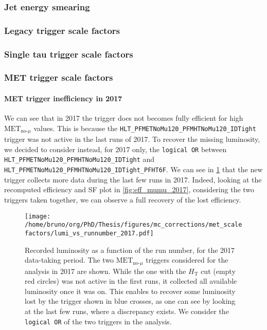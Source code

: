 \documentclass[11pt]{article}
\newcommand{\httt}{H_{\text{T}}}
\newcommand{\metnomu}{\text{MET}_{\text{no-}\mu}}
\newcommand{\logicor}[1]{\texttt{logical~OR}}
\begin{document}
\subsubsection{Jet energy smearing}
\label{sec:org4f72511}
\subsubsection{Legacy trigger scale factors}
\label{sec:orgbfe789a}
\subsubsection{Single tau trigger scale factors}
\label{sec:org2f33b5b}
\subsubsection{MET trigger scale factors}
\label{sec:org852d869}
\paragraph{MET trigger inefficiency in 2017}

We can see that in 2017 the trigger does not becomes fully efficient for high \(\metnomu\) values.
This is because the \texttt{HLT\_PFMETNoMu120\_PFMHTNoMu120\_IDTight} trigger was not active in the last runs of 2017.
To recover the missing luminosity, we decided to consider instead, for 2017 only, the \logicor{} between \texttt{HLT\_PFMETNoMu120\_PFMHTNoMu120\_IDTight} and \texttt{HLT\_PFMETNoMu120\_PFMHTNoMu120\_IDTight\_PFHT6F}.
We can see in \cref{fig:lumi_vs_runnumber_2017} that the new trigger collects more data during the last few runs in 2017.
Indeed, looking at the recomputed efficiency and SF plot in \cref{fig:eff_mumu_2017}, considering the two triggers taken together, we can observe a full recovery of the lost efficiency.

\begin{figure}
\texttt{[image: /home/bruno/org/PhD/Thesis/figures/mc\_corrections/met\_scalefactors/lumi\_vs\_runnumber\_2017.pdf]}
\caption{\label{fig:lumi_vs_runnumber_2017}Recorded luminosity as a function of the run number, for the 2017 data-taking period. The two \(\metnomu\) triggers considered for the analysis in 2017 are shown. While the one with the \(\httt\) cut (empty red circles) was not active in the first runs,  it collected all available luminosity once it was on. This enables to recover some luminosity lost by the trigger shown in blue crosses, as one can see by looking at the last few runs, where a discrepancy exists. We consider the \logicor{} of the two triggers in the analysis.}
\end{figure}
\end{document}
